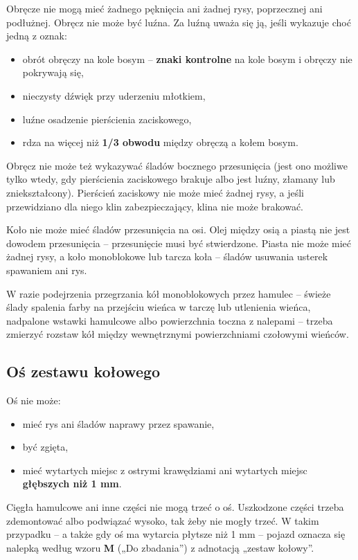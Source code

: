 Obręcze nie mogą mieć żadnego pęknięcia ani żadnej rysy, poprzecznej ani podłużnej. Obręcz nie może być luźna. Za luźną uważa się ją, jeśli wykazuje choć jedną z oznak:
\begin{itemize}
	\item obrót obręczy na kole bosym – \textbf{znaki kontrolne} na kole bosym i obręczy nie pokrywają się,
	\item nieczysty dźwięk przy uderzeniu młotkiem,
	\item luźne osadzenie pierścienia zaciskowego,
	\item rdza na więcej niż \textbf{1/3 obwodu} między obręczą a kołem bosym.
\end{itemize}
Obręcz nie może też wykazywać śladów bocznego przesunięcia (jest ono możliwe tylko wtedy, gdy pierścienia zaciskowego brakuje albo jest luźny, złamany lub zniekształcony). Pierścień zaciskowy nie może mieć żadnej rysy, a jeśli przewidziano dla niego klin zabezpieczający, klina nie może brakować.

Koło nie może mieć śladów przesunięcia na osi. Olej między osią a piastą nie jest dowodem przesunięcia – przesunięcie musi być stwierdzone. Piasta nie może mieć żadnej rysy, a koło monoblokowe lub tarcza koła – śladów usuwania usterek spawaniem ani rys.

W razie podejrzenia przegrzania kół monoblokowych przez hamulec – świeże ślady spalenia farby na przejściu wieńca w tarczę lub utlenienia wieńca, nadpalone wstawki hamulcowe albo powierzchnia toczna z nalepami – trzeba zmierzyć rozstaw kół między wewnętrznymi powierzchniami czołowymi wieńców.

\subsection*{Oś zestawu kołowego}

Oś nie może:
\begin{itemize}
	\item mieć rys ani śladów naprawy przez spawanie,
	\item być zgięta,
	\item mieć wytartych miejsc z ostrymi krawędziami ani wytartych miejsc \textbf{głębszych niż 1 mm}.
\end{itemize}
Cięgła hamulcowe ani inne części nie mogą trzeć o oś. Uszkodzone części trzeba zdemontować albo podwiązać wysoko, tak żeby nie mogły trzeć. W takim przypadku – a także gdy oś ma wytarcia płytsze niż 1 mm – pojazd oznacza się nalepką według wzoru \textbf{M} („Do zbadania”) z adnotacją „zestaw kołowy”.


